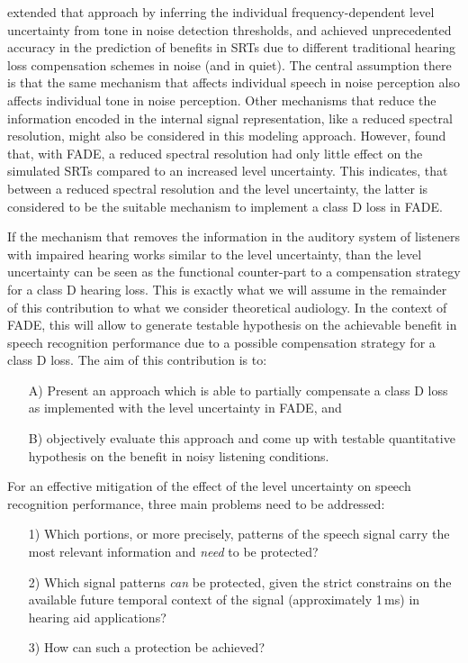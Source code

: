 \documentclass[10pt,a4paper,twocolumn]{article}
\begin{document}
\cite{schaedler2020a} extended that approach by inferring the individual frequency-dependent level uncertainty from tone in noise detection thresholds, and achieved unprecedented accuracy in the prediction of benefits in SRTs due to different traditional hearing loss compensation schemes in noise (and in quiet).
%
The central assumption there is that the same mechanism that affects individual speech in noise perception also affects individual tone in noise perception.
%
Other mechanisms that reduce the information encoded in the internal signal representation, like a reduced spectral resolution, might also be considered in this modeling approach.
%
However, \cite{huelsmeier2020} found that, with FADE, a reduced spectral resolution had only little effect on the simulated SRTs compared to an increased level uncertainty.
%
This indicates, that between a reduced spectral resolution and the level uncertainty, the latter is considered to be the suitable mechanism to implement a class D loss in FADE.

If the mechanism that removes the information in the auditory system of listeners with impaired hearing works similar to the level uncertainty, than the level uncertainty can be seen as the functional counter-part to a compensation strategy for a class D hearing loss.
%
This is exactly what we will assume in the remainder of this contribution to what we consider theoretical audiology.
%
In the context of FADE, this will allow to generate testable hypothesis on the achievable benefit in speech recognition performance due to a possible compensation strategy for a class D loss.
%
The aim of this contribution is to:
\begin{itemize}
	\item[A)] Present an approach which is able to partially compensate a class D loss as implemented with the level uncertainty in FADE, and
	\item[B)] objectively evaluate this approach and come up with testable quantitative hypothesis on the benefit in noisy listening conditions.
\end{itemize}

For an effective mitigation of the effect of the level uncertainty on speech recognition performance, three main problems need to be addressed:
\begin{itemize}
  \item[1)] Which portions, or more precisely, patterns of the speech signal carry the most relevant information and \emph{need} to be protected?
  \item[2)] Which signal patterns \emph{can} be protected, given the strict constrains on the available future temporal context of the signal (approximately 1\,ms) in hearing aid applications?
  \item[3)] How can such a protection be achieved?
\end{itemize}
\end{document}
